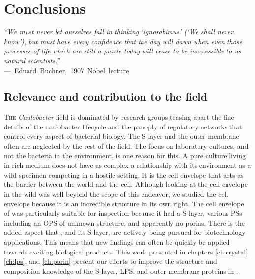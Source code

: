 
\acresetall
\resetlinenumber[1]
\chapter{Conclusions}
\label{ch:conclusions}
\begin{epigraph}
  \emph{``We must never let ourselves fall in thinking `ignorabimus' (`We shall never know'), but must have every confidence that the day will dawn when even those processes of life which are still a puzzle today will cease to be inaccessible to us natural scientists.''}\\ ---~Eduard~Buchner,~1907~Nobel~lecture 
\end{epigraph}
\section{Relevance and contribution to the field}\label{sec:relev-contr-field} 

\lettrine[lines=2]{T}{he} \textit{Caulobacter} field is dominated by research groups teasing apart the fine details of the \acl{caulobacter} lifecycle and the panoply of regulatory networks that control every aspect of bacterial biology. The \ac{S-layer}
 and the outer membrane often are neglected by the rest of the field. The focus
 on laboratory cultures, and not the bacteria in the environment, is one reason
 for this. A pure culture living in rich medium does not have as complex a
 relationship with its environment as a wild specimen competing in a hostile
 setting. It is the cell envelope that acts as the barrier between the world and
 the cell. Although looking at the \caulobacter cell envelope in the wild was well beyond the scope of this endeavor, we studied the cell envelope because it is an incredible structure in its own right. The cell envelope of \caulobacter{} was particularly suitable for inspection because it had a \acl{S-layer}, various \aclp{PS} including an \ac{OPS} of unknown structure, and apparently no porins. There is the added aspect that \caulobacter{}, and its \ac{S-layer}, are actively being pursued for biotechnology applications. This means that new findings can often be quickly be applied towards exciting biological products. This work presented in chapters \ref{ch:crystal} \ref{ch:lps}, and \ref{ch:porin} present our efforts to improve the structure and composition knowledge of the \ac{S-layer}, \ac{LPS}, and outer membrane proteins in \caulobacter{}.
 
